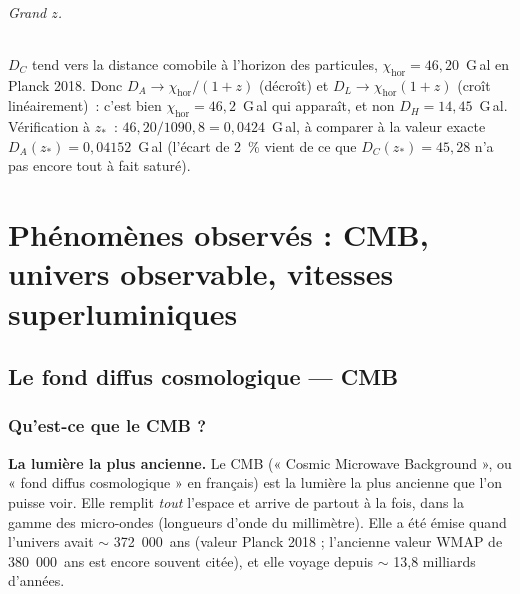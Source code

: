 \documentclass[11pt,a4paper,openany]{report}
\begin{document}
\paragraph{Grand $z$.}
$D_{C}$ tend vers la distance comobile à l'horizon des particules,
$\chi_{\text{hor}} = 46{,}20$~G\,al en Planck 2018. Donc
$D_{A}\to \chi_{\text{hor}}/(1+z)$ (décroît) et
$D_{L}\to \chi_{\text{hor}}(1+z)$ (croît linéairement)~: c'est bien
$\chi_{\text{hor}} = 46{,}2$~G\,al qui apparaît, et non $D_{H} = 14{,}45$~G\,al.
Vérification à $z_{*}$~: $46{,}20/1090{,}8 = 0{,}0424$~G\,al, à comparer à la
valeur exacte $D_{A}(z_{*}) = 0{,}04152$~G\,al (l'écart de 2~\% vient de ce que
$D_{C}(z_{*}) = 45{,}28$ n'a pas encore tout à fait saturé).

\clearpage

\part{Phénomènes observés : CMB, univers observable, vitesses superluminiques}

\chapter{Le fond diffus cosmologique --- CMB}
\label{chap:cmb_observ}

\section{Qu'est-ce que le CMB ?}

\begin{tcolorbox}[vulgarisation]
\textbf{La lumière la plus ancienne.} Le CMB (« Cosmic Microwave Background »,
ou « fond diffus cosmologique » en français) est la lumière la plus ancienne
que l'on puisse voir. Elle remplit \emph{tout} l'espace et arrive de partout à
la fois, dans la gamme des micro-ondes (longueurs d'onde du millimètre). Elle
a été émise quand l'univers avait $\sim$ 372~000~ans (valeur Planck 2018 ; l'ancienne
valeur WMAP de 380~000~ans est encore souvent citée), et elle voyage depuis
$\sim$ 13{,}8 milliards d'années.
\end{tcolorbox}
\end{document}
